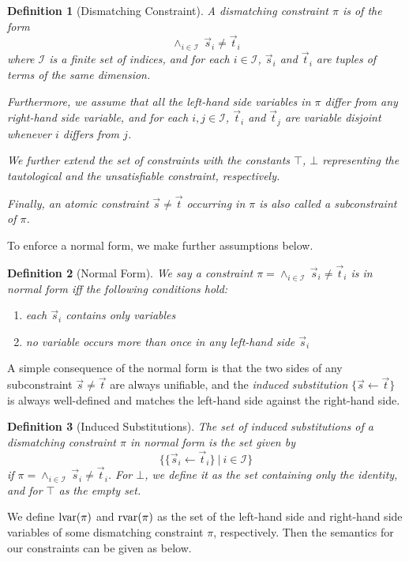 \documentclass[a4paper]{article}
\newtheorem{defi}{Definition}[section]
\begin{document}
\begin{defi}[Dismatching Constraint]\label{dmcDef}
A \emph{dismatching constraint} $\pi$ is of the form
\[\land_{i \in \mathcal{I}}~\vec{s}_i \ne \vec{t}_i\]
where $\mathcal{I}$ is a finite set of indices, and for each $i \in \mathcal{I}$, $\vec{s}_i$ and $\vec{t}_i$ are tuples of terms of the same dimension. 

Furthermore, we assume that all the left-hand side variables in $\pi$ differ from any right-hand side variable, 
and for each $i, j \in \mathcal{I}$, $\vec{t}_i$ and  $\vec{t}_j$ are variable disjoint whenever $i$ differs from $j$.

We further extend the set of constraints with the constants $\top$, $\bot$ representing the tautological and the unsatisfiable constraint, respectively.

Finally, an \emph{atomic constraint} $\vec{s} \ne \vec{t}$ occurring in $\pi$ is also called \emph{a subconstraint of $\pi$}.
\end{defi}
\noindent
To enforce a normal form, we make further assumptions below.
\begin{defi}[Normal Form]
We say a constraint $\pi = \land_{i \in \mathcal{I}}~\vec{s}_i \ne \vec{t}_i$ is \emph{in normal form} iff
the following conditions hold:
\begin{enumerate}[($C$1)]
	\item each $\vec{s}_i$ contains only variables
	\item no variable occurs more than once in any left-hand side $\vec{s}_i$
\end{enumerate}
\end{defi}

A simple consequence of the normal form is that the two sides of any subconstraint $\vec{s} \ne \vec{t}$ are 
always unifiable, and the \emph{induced substitution} $\{ \vec{s} \gets \vec{t} \}$ is always well-defined and 
matches the left-hand side against the right-hand side.

\begin{defi}[Induced Substitutions]
The \emph{set of induced substitutions} of a dismatching constraint $\pi$ in normal form is the set given by
\[\{ \{\vec{s}_i \gets \vec{t}_i\}~|~i \in \mathcal{I} \}\]
if $\pi = \land_{i \in \mathcal{I}}~\vec{s}_i \ne \vec{t}_i$. For $\bot$, we define 
it as the set containing only the identity, and for $\top$ as the empty set.
\end{defi}

We define $\operatorname{lvar}(\pi)$ and $\operatorname{rvar}(\pi)$ as the set of the left-hand side and right-hand side variables of some dismatching constraint $\pi$, respectively. 
Then the semantics for our constraints can be given as below.
\end{document}
